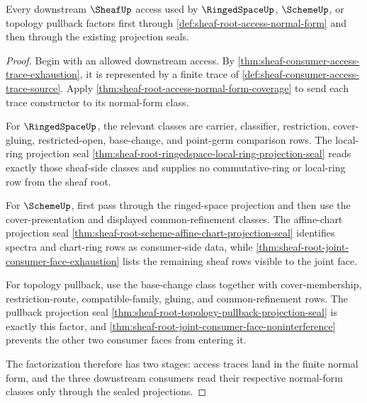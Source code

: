 \begin{theorem}
\label{thm:sheaf-root-access-normal-form-consumer-factorization}
Every downstream $\SheafUp$ access used by $\RingedSpaceUp$, $\SchemeUp$, or topology pullback factors first through \autoref{def:sheaf-root-access-normal-form} and then through the existing projection seals.
\end{theorem}
\begin{proof}
Begin with an allowed downstream access. By \autoref{thm:sheaf-consumer-access-trace-exhaustion}, it is represented by a finite trace of \autoref{def:sheaf-consumer-access-trace-source}. Apply \autoref{thm:sheaf-root-access-normal-form-coverage} to send each trace constructor to its normal-form class.

For $\RingedSpaceUp$, the relevant classes are carrier, classifier, restriction, cover-gluing, restricted-open, base-change, and point-germ comparison rows. The local-ring projection seal \autoref{thm:sheaf-root-ringedspace-local-ring-projection-seal} reads exactly those sheaf-side classes and supplies no commutative-ring or local-ring row from the sheaf root.

For $\SchemeUp$, first pass through the ringed-space projection and then use the cover-presentation and displayed common-refinement classes. The affine-chart projection seal \autoref{thm:sheaf-root-scheme-affine-chart-projection-seal} identifies spectra and chart-ring rows as consumer-side data, while \autoref{thm:sheaf-root-joint-consumer-face-exhaustion} lists the remaining sheaf rows visible to the joint face.

For topology pullback, use the base-change class together with cover-membership, restriction-route, compatible-family, gluing, and common-refinement rows. The pullback projection seal \autoref{thm:sheaf-root-topology-pullback-projection-seal} is exactly this factor, and \autoref{thm:sheaf-root-joint-consumer-face-noninterference} prevents the other two consumer faces from entering it.

The factorization therefore has two stages: access traces land in the finite normal form, and the three downstream consumers read their respective normal-form classes only through the sealed projections.
\end{proof}

